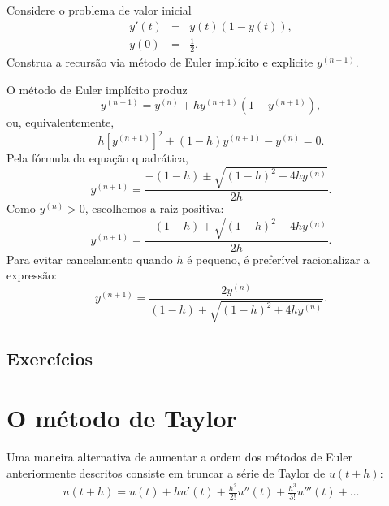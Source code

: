 \begin{exeresol}
Considere o problema de valor inicial
\begin{eqnarray}
y'(t)&=&y(t)(1-y(t)),\\
y(0)&=&\frac{1}{2}.
\end{eqnarray}
Construa a recursão via método de Euler implícito e explicite $y^{(n+1)}$.
\end{exeresol}
\begin{resol}
O método de Euler implícito produz
\begin{equation}
y^{(n+1)}=y^{(n)}+h y^{(n+1)}\left(1-y^{(n+1)}\right),
\end{equation}
ou, equivalentemente,
\begin{equation}
h\left[y^{(n+1)}\right]^2+(1-h)y^{(n+1)}-y^{(n)}=0.
\end{equation}
Pela fórmula da equação quadrática,
\begin{equation}
y^{(n+1)}=
\frac{-(1-h)\pm\sqrt{(1-h)^2+4hy^{(n)}}}{2h}.
\end{equation}
Como $y^{(n)}>0$, escolhemos a raiz positiva:
\begin{equation}
y^{(n+1)}=
\frac{-(1-h)+\sqrt{(1-h)^2+4hy^{(n)}}}{2h}.
\end{equation}
Para evitar cancelamento quando $h$ é pequeno, é preferível racionalizar a expressão:
\begin{equation}
y^{(n+1)}=
\frac{2y^{(n)}}{(1-h)+\sqrt{(1-h)^2+4hy^{(n)}}}.
\end{equation}
\end{resol}

\subsection*{Exercícios}

\construirExer

\section{O método de Taylor}
Uma maneira alternativa de aumentar a ordem dos métodos de Euler anteriormente descritos consiste em truncar a série de Taylor de $u(t+h)$:
\begin{eqnarray}
 u(t+h)=u(t) +h u'(t)+ \frac{h^2}{2!}u''(t)+\frac{h^3}{3!}u'''(t)+\ldots
\end{eqnarray}

